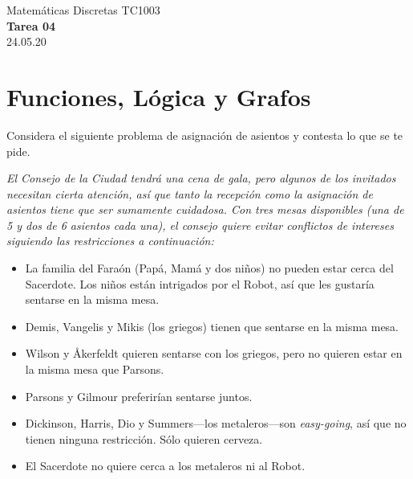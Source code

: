 \documentclass[]{book}
\theoremstyle{definition}
\begin{document}
\begin{center}
{\huge Matemáticas Discretas TC1003}\\[1.5ex]
{\large \textbf{Tarea 04}\\[1.5ex] %
24.05.20} %
\end{center}

\vspace{0.2 cm}

\section*{Funciones, Lógica y Grafos}


\bigskip

{\large Considera el siguiente problema de asignación de asientos y contesta lo que se te pide.}

\bigskip

\begin{tcolorbox}
\slshape El Consejo de la Ciudad tendrá una cena de gala, pero algunos de los invitados necesitan cierta atención, así que tanto la recepción como la asignación de asientos tiene que ser sumamente cuidadosa.
Con tres mesas disponibles (una de 5 y dos de 6 asientos cada una), el consejo quiere evitar conflictos de intereses siguiendo las restricciones a continuación:

\begin{itemize}
	\item La familia del Faraón (Papá, Mamá y dos niños) no pueden estar cerca del Sacerdote. Los niños están intrigados por el Robot, así que les gustaría sentarse en la misma mesa.
	\item Demis, Vangelis y Mikis (los griegos) tienen que sentarse en la misma mesa.
	\item Wilson y \AA kerfeldt quieren sentarse con los griegos, pero no quieren estar en la misma mesa que Parsons.
	\item Parsons y Gilmour preferirían sentarse juntos.
	\item Dickinson, Harris, Dio y Summers---los metaleros---son \textit{easy-going}, así que no tienen ninguna restricción. Sólo quieren cerveza.
	\item El Sacerdote no quiere cerca a los metaleros ni al Robot.
\end{itemize}
\end{tcolorbox}
\end{document}
